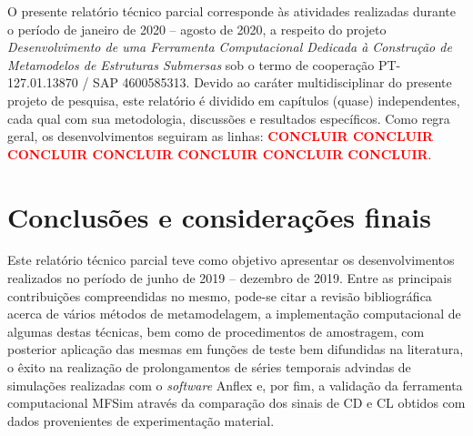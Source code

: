 \documentclass[12pt,fleqn,a4paper]{report}
\begin{document}
		\noindent O presente relatório técnico parcial corresponde às atividades realizadas durante o período de janeiro de 2020 -- agosto de 2020, a respeito do projeto \textit{Desenvolvimento de uma Ferramenta Computacional Dedicada à Construção de Metamodelos de Estruturas Submersas} sob o termo de cooperação PT-127.01.13870 / SAP 4600585313. Devido ao caráter multidisciplinar do presente projeto de pesquisa, este relatório é dividido em capítulos (quase) independentes, cada qual com sua metodologia, discussões e resultados específicos. Como regra geral, os desenvolvimentos seguiram as linhas: \textcolor{red}{\textbf{CONCLUIR CONCLUIR CONCLUIR CONCLUIR CONCLUIR CONCLUIR CONCLUIR}}.
	
	\newpage
	\tableofcontents
	\newpage
	
	
	
	
%	
%	
%	
%	
%	
%	
%	

	\chapter{Conclusões e considerações finais}
		\label{finalsec}
		
		Este relatório técnico parcial teve como objetivo apresentar os desenvolvimentos realizados no período de junho de 2019 -- dezembro de 2019. Entre as principais contribuições compreendidas no mesmo, pode-se citar a revisão bibliográfica acerca de vários métodos de metamodelagem, a implementação computacional de algumas destas técnicas, bem como de procedimentos de amostragem, com posterior aplicação das mesmas em funções de teste bem difundidas na literatura, o êxito na realização de prolongamentos de séries temporais advindas de simulações realizadas com o \textit{software} Anflex e, por fim, a validação da ferramenta computacional MFSim através da comparação dos sinais de CD e CL obtidos com dados provenientes de experimentação material. 
		
	\begin{singlespace}
		
	\end{singlespace}
\end{document}
